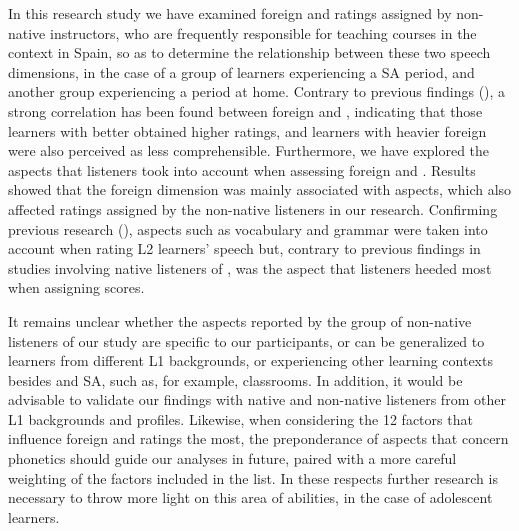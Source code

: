 \documentclass[output=paper]{langsci/langscibook}
\begin{document}
In this research study we have examined foreign  and  ratings assigned by  non-native instructors, who are frequently responsible for teaching   courses in the  context in Spain, so as to determine the relationship between these two speech dimensions, in the case of a group of  learners experiencing a SA period, and another group experiencing a  period at home. Contrary to previous findings (\citealt{MunroDerwing1999,DerwingMunro2009}), a strong correlation has been found between foreign  and , indicating that those learners with better  obtained higher  ratings, and learners with heavier foreign  were also perceived as less comprehensible. Furthermore, we have explored the aspects that listeners took into account when assessing foreign  and . Results showed that the foreign  dimension was mainly associated with  aspects, which also affected  ratings assigned by the non-native listeners in our research. Confirming previous research (\citealt{TrofimovichIsaacs2012}), aspects such as vocabulary and grammar were taken into account when rating {L2} learners’ speech  but, contrary to previous findings in studies involving native listeners of ,  was the aspect that listeners heeded most when assigning  scores. 

It remains unclear whether the aspects reported by the group of non-native listeners of our study are specific to our participants, or can be generalized to learners from different {L1} backgrounds, or experiencing other learning contexts besides  and SA, such as, for example,  classrooms. In addition, it would be advisable to validate our findings with  native and non-native listeners from other {L1} backgrounds and profiles. Likewise, when considering the 12 factors that influence foreign  and  ratings the most, the preponderance of aspects that concern phonetics should guide our analyses in future, paired with a more careful weighting of the factors included in the list. In these respects further research is necessary to throw more light on this area of  abilities, in the case of  adolescent learners. 
\end{document}
